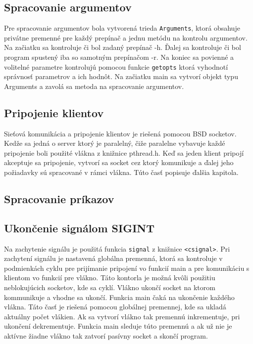 \documentclass[11pt,a4paper]{article}
\begin{document}
\subsection{Spracovanie argumentov}
Pre spracovanie argumentov bola vytvorená trieda \texttt{Arguments}, ktorá obsahuje privátne premenné pre každý prepínač a jednu metódu na kontrolu argumentov. Na začiatku sa kontroluje či bol zadaný prepínač -h. Ďalej sa kontroluje či bol program spustený iba so samotným prepínačom -r. Na koniec sa povienné a volitelné parametre kontrolujú pomocou funkcie \texttt{getopts} ktorá vyhodnotí správnosť parametrov a ich hodnôt. Na začiatku main sa vytvorí objekt typu Arguments a zavolá sa metoda na spracovanie argumentov.

\subsection{Pripojenie klientov}
Sieťová komunikácia a pripojenie klientov je riešená pomocou BSD socketov. Kedže sa jedná o server ktorý je paralelný, čiže paralelne vybavuje každé pripojenie boli použité vlákna z knižnice pthread.h. Keď sa jeden klient pripojí akceptuje sa pripojenie, vytvorí sa socket cez ktorý komunikuje a ďalej jeho požiadavky sú spracované v rámci vlákna. Túto časť popisuje ďalšia kapitola.

\subsection{Spracovanie príkazov}


\subsection{Ukončenie signálom SIGINT}
Na zachytenie signálu je použitá funkcia \texttt{signal} z knižnice \texttt{<csignal>}. Pri zachytení signálu je nastavená globálna premenná, ktorá sa kontroluje v podmienkách 
cyklu pre prijímanie pripojení vo funkcií main a pre komunikáciu s klientom vo funkcií pre vlákno. Táto kontorla je možná kvôli použitiu neblokujúcich socketov, kde sa cyklí. Vlákno ukončí socket na ktorom kommunikuje a vhodne sa ukončí. Funkcia main čaká na ukončenie každého vlákna. Táto časť je riešená pomocou globálnej premennej, kde sa ukladá aktuálny počet vlákien. Ak sa vytvorí vlákno tak premennú inkrementuje, pri ukončení dekrementuje. Funkcia main sleduje túto premennú a ak už nie je aktívne žiadne vlákno tak zatvorí pasívny socket a skončí program.
\end{document}
